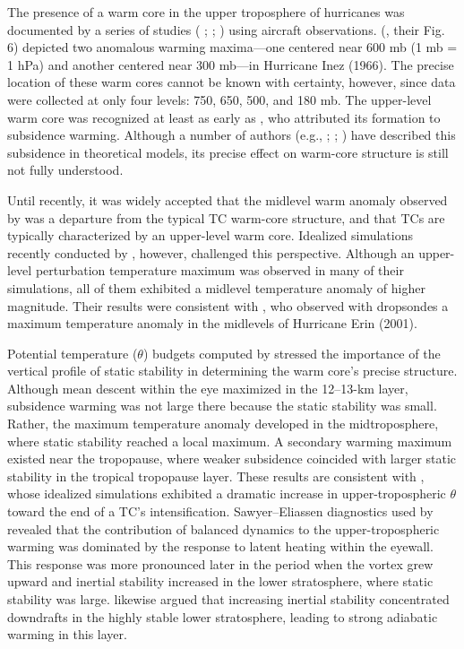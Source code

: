 The presence of a warm core in the upper troposphere of hurricanes was documented by a series of studies (\citeauthor{LaSeurHawkins1963} \citeyear{LaSeurHawkins1963}; \citeauthor{HawkinsRubsam1968} \citeyear{HawkinsRubsam1968}; \citeauthor{HawkinsImbembo1976} \citeyear{HawkinsImbembo1976}) using aircraft observations.
\citeauthor{HawkinsImbembo1976} (\citeyear{HawkinsImbembo1976}, their Fig. 6) depicted two anomalous warming maxima---one centered near 600 mb (1 mb = 1 hPa) and another centered near 300 mb---in Hurricane Inez (1966).
The precise location of these warm cores cannot be known with certainty, however, since data were collected at only four levels: 750, 650, 500, and 180 mb.
The upper-level warm core was recognized at least as early as \cite{Haurwitz1935}, who attributed its formation to subsidence warming.
Although a number of authors (e.g., \citeauthor{Malkus1958} \citeyear{Malkus1958}; \citeauthor{Willoughby1979} \citeyear{Willoughby1979}; \citeauthor{Smith1980} \citeyear{Smith1980}) have described this subsidence in theoretical models, its precise effect on warm-core structure is still not fully understood.

Until recently, it was widely accepted that the midlevel warm anomaly observed by \cite{HawkinsImbembo1976} was a departure from the typical TC warm-core structure, and that TCs are typically characterized by an upper-level warm core.
Idealized simulations recently conducted by \cite{SternNolan2012}, however, challenged this perspective.
Although an upper-level perturbation temperature maximum was observed in many of their simulations, all of them exhibited a midlevel temperature anomaly of higher magnitude.
Their results were consistent with \cite{Halversonetal2006}, who observed with dropsondes a maximum temperature anomaly in the midlevels of Hurricane Erin (2001).

Potential temperature ($\theta$) budgets computed by \cite{SternZhang2013} stressed the importance of the vertical profile of static stability in determining the warm core’s precise structure.
Although mean descent within the eye maximized in the 12--13-km layer, subsidence warming was not large there because the static stability was small.
Rather, the maximum temperature anomaly developed in the midtroposphere, where static stability reached a local maximum.
A secondary warming maximum existed near the tropopause, where weaker subsidence coincided with larger static stability in the tropical tropopause layer.
These results are consistent with \cite{OhnoSatoh2015}, whose idealized simulations exhibited a dramatic increase in upper-tropospheric $\theta$ toward the end of a TC’s intensification.
Sawyer--Eliassen diagnostics used by \cite{PendergrassWilloughby2009} revealed that the contribution of balanced dynamics to the upper-tropospheric warming was dominated by the response to latent heating within the eyewall.
This response was more pronounced later in the period when the vortex grew upward and inertial stability increased in the lower stratosphere, where static stability was large.
\cite{ZhangChen2012} likewise argued that increasing inertial stability concentrated downdrafts in the highly stable lower stratosphere, leading to strong adiabatic warming in this layer.

